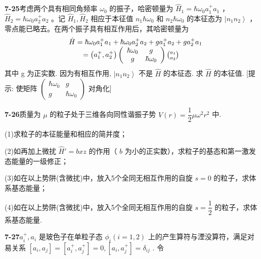 \textbf{7-25}\quad 考虑两个具有相同角频率 $\displaystyle \omega_0$ 的振子，哈密顿量为 $\displaystyle \hat{H}_1 = \hbar \omega_0 a_1^+ a_1$ ， $\displaystyle \hat{H}_2 = \hbar \omega_0 a_2^+ a_2$ 。记 $\displaystyle \hat{H}_1, \hat{H}_2$ 相应于本征值 $\displaystyle n_1 \hbar \omega_0$ 和 $\displaystyle n_2 \hbar \omega_0$ 的本征态为 $\displaystyle \left| n_1 n_2 \right\rangle$ ，零点能已略去。在两个振子具有相互作用后，其哈密顿量为
$$
\begin{array}{r l} & {\hat {H} = \hbar \omega_ {0} a _ {1} ^ {+} a _ {1} + \hbar \omega_ {0} a _ {2} ^ {+} a _ {2} + g a _ {1} ^ {+} a _ {2} + g a _ {2} ^ {+} a _ {1}} \\ & {\qquad = \left(a _ {1} ^ {+}, a _ {2} ^ {+}\right) \left( \begin{array}{c c} {\hbar \omega_ {0}} & {g} \\ {g} & {\hbar \omega_ {0}} \end{array} \right) \binom {a _ {1}} {a _ {2}}} \end{array}
$$
其中 g 为正实数. 因为有相互作用, $\displaystyle \left|n_{1}n_{2}\right\rangle$ 不是 $\displaystyle \hat{H}$ 的本征态. 求 $\displaystyle \hat{H}$ 的本征值. [提示: 使矩阵 $\displaystyle \begin{pmatrix}\hbar\omega_{0}&g\\g&\hbar\omega_{0}\end{pmatrix}$ 对角化]

\vfill

\newpage

\textbf{7-26}\quad 质量为 $\displaystyle \mu$ 的粒子处于三维各向同性谐振子势 $\displaystyle V(r) = \dfrac{1}{2}\mu \omega^2 r^2$ 中.

(1)求粒子的本征能量和相应的简并度；

(2)如再加上微扰 $\displaystyle \hat{H}' = bxz$ 的作用（ $\displaystyle b$ 为小的正实数），求粒子的基态和第一激发态能量的一级修正；

(3)如在以上势阱(含微扰)中，放入5个全同无相互作用的自旋 $\displaystyle s = 0$ 的粒子，求体系基态能量；

(4)如在以上势阱(含微扰)中，放入5个全同无相互作用的自旋 $\displaystyle s = \dfrac{1}{2}$ 的粒子，求体系基态能量.

\vfill

\newpage

\textbf{7-27}\quad $\displaystyle a_{i}^{+}, a_{i}$ 是玻色子在单粒子态 $\displaystyle \phi_{i}(i = 1,2)$ 上的产生算符与湮没算符，满足对易关系 $\displaystyle [a_{i}, a_{j}] = [a_{i}^{+}, a_{j}^{+}] = 0, [a_{i}, a_{j}^{+}] = \delta_{ij}$ . 令


